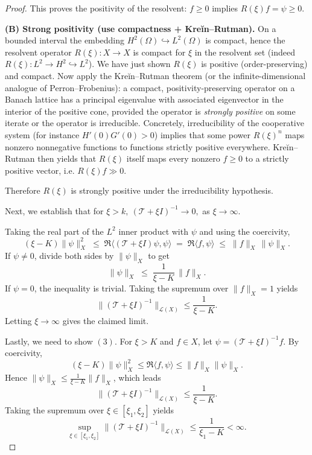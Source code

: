 \documentclass[a4paper,11pt]{amsart}
\theoremstyle{definition}
\numberwithin{equation}{section}
\theoremstyle{definition}
\begin{document}
\begin{proof}
This proves the positivity of the resolvent: \(f\geq0\) implies \(R(\xi)f=\psi\geq0\).


\textbf{(B) Strong positivity (use compactness + Kreĭn--Rutman).} On a bounded interval the embedding $H^2(\Omega)\hookrightarrow L^2(\Omega)$ is compact, hence the resolvent operator $R(\xi):X\to X$ is compact for $\xi$ in the resolvent set (indeed $R(\xi):L^2\to H^2\hookrightarrow L^2$). We have just shown $R(\xi)$ is positive (order-preserving) and compact. Now apply the Kreĭn--Rutman theorem (or the infinite-dimensional analogue of Perron--Frobenius): a compact, positivity-preserving operator on a Banach lattice has a principal eigenvalue with associated eigenvector in the interior of the positive cone, provided the operator is \emph{strongly positive} on some iterate or the operator is irreducible. Concretely, irreducibility of the cooperative system (for instance $H'(0)G'(0)>0$) implies that some power $R(\xi)^n$ maps nonzero nonnegative functions to functions strictly positive everywhere. Kreĭn--Rutman then yields that $R(\xi)$ itself maps every nonzero $f\geq0$ to a strictly positive vector, i.e. $R(\xi)f\gg0$.


Therefore $R(\xi)$ is strongly positive under the irreducibility hypothesis.

Next, we establish that for $\xi >k,~(\mathscr{T}+ \xi I)^{-1} \rightarrow 0,$ as $\xi \rightarrow \infty.$


Taking the real part of the $L^2$ inner product with $\psi$ and using the coercivity,
\[
(\xi-K)\|\psi\|_{X}^{2}
\;\leq\; \Re\langle (\mathscr{T} +\xi I)\psi,\psi\rangle
\;=\; \Re\langle f,\psi\rangle
\;\leq\; \|f\|_{X}\,\|\psi\|_{X}.
\]
If $\psi\neq 0$, divide both sides by $\|\psi\|_{X}$ to get
\[
\|\psi\|_{X} \;\leq\; \frac{1}{\xi-K}\,\|f\|_{X}.
\]
If $\psi=0$, the inequality is trivial. Taking the supremum over $\|f\|_{X}=1$ yields
\[
\big\|(\mathscr T+\xi I)^{-1}\big\|_{\mathcal L(X)} \leq \frac{1}{\xi-K}.
\]
Letting $\xi\to\infty$ gives the claimed limit.


Lastly, we need to show  $(3).$  For $\xi>K$ and $f \in X$, let $\psi = (\mathscr{T} + \xi I)^{-1} f$.
By coercivity,
\[
(\xi-K)\|\psi\|_{X}^{2}
  \leq \Re \langle f, \psi \rangle
  \leq \|f\|_{X}\|\psi\|_{X}.
\]
Hence $\|\psi\|_{X} \leq \tfrac{1}{\xi-K}\|f\|_{X}$, which leads
\[
\|(\mathscr{T} + \xi I)^{-1}\|_{\mathcal{L}(X)} \leq \frac{1}{\xi-K}.
\]
Taking the supremum over $\xi\in[\xi_{1},\xi_{2}]$ yields
\[
\sup_{\xi \in [\xi_{1}, \xi_{2}]} \|(\mathscr{T} + \xi I)^{-1}\|_{\mathcal{L}(X)}
   \leq \frac{1}{\xi_{1}-K} < \infty.
\]

\end{proof}
\end{document}
